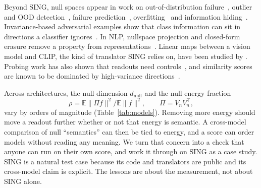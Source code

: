 \documentclass[10pt]{article}
\begin{document}
Beyond SING, null spaces appear in work on out-of-distribution failure~\citep{idnani2023}, outlier and OOD detection~\citep{vim2022,cook2020,zongur2025actsub,sun2022knn,ammar2024neco}, failure prediction~\citep{shin2026canary}, overfitting~\citep{rezaei2023} and information hiding~\citep{li2024null}.
Invariance-based adversarial examples show that class information can sit in directions a classifier ignores~\citep{jacobsen2019excessive}.
In NLP, nullspace projection and closed-form erasure remove a property from representations~\citep{ravfogel2020inlp,elazar2021amnesic,belrose2023leace}.
Linear maps between a vision model and CLIP, the kind of translator SING relies on, have been studied by \citet{moayeri2023text2concept}.
Probing work has also shown that readouts need controls~\citep{hewitt2019control}, and similarity scores are known to be dominated by high-variance directions~\citep{davari2023cka}.

Across architectures, the null dimension $d_{\mathrm{null}}$ and the null energy fraction
\[
\rho = \mathbb{E}\|\Pi f\|^2 / \mathbb{E}\|f\|^2, \qquad \Pi = V_nV_n^\top,
\]
vary by orders of magnitude (Table~\ref{tab:models}).
Removing more energy should move a readout further whether or not that energy is semantic.
A cross-model comparison of null ``semantics'' can then be tied to energy, and a score can order models without reading any meaning.
We turn that concern into a check that anyone can run on their own score, and work it through on SING as a case study.
SING is a natural test case because its code and translators are public and its cross-model claim is explicit. The lessons are about the measurement, not about SING alone.
\end{document}
